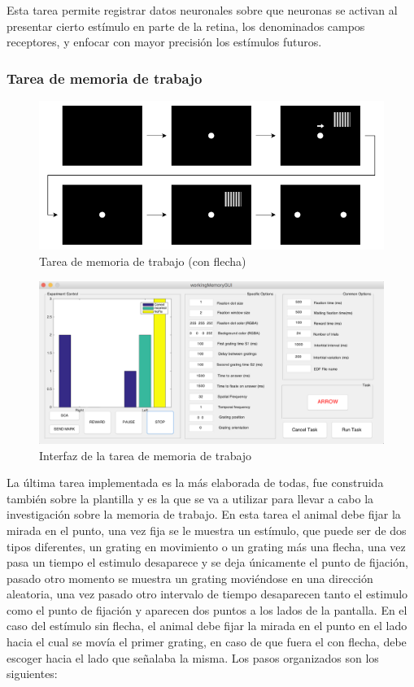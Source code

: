 \documentclass[conference]{IEEEtran}
\begin{document}
Esta tarea permite registrar datos neuronales sobre que neuronas se activan al presentar cierto estímulo en parte de la retina, los denominados campos receptores,  y enfocar con mayor precisión los estímulos futuros.


\subsubsection*{Tarea de memoria de trabajo}

\begin{figure}[htbp]
\centerline{\includegraphics[width=\linewidth]{figures/memory_task}}
\caption{Tarea de memoria de trabajo (con flecha)}
\label{figMemoryTask}
\end{figure}

\begin{figure}
  \includegraphics[width=\textwidth]{figures/memory_gui}
  \caption{Interfaz de la tarea de memoria de trabajo}
  \label{figMemoryGui}

\end{figure}

La última tarea implementada es la más elaborada de todas, fue construida también sobre la plantilla y es la que se va a utilizar para llevar a cabo la investigación sobre la memoria de trabajo. 
En esta tarea el animal debe fijar la mirada en el punto, una vez fija se le muestra un estímulo, que puede ser de dos tipos diferentes, un grating en movimiento o un grating más una flecha, una vez pasa un tiempo el estimulo desaparece y se deja únicamente el punto de fijación, pasado otro momento se muestra un grating moviéndose en una dirección aleatoria, una vez pasado otro intervalo de tiempo desaparecen tanto el estimulo como el punto de fijación y aparecen dos puntos a los lados de la pantalla. En el caso del estímulo sin flecha, el animal debe fijar la mirada en el punto en el lado hacia el cual se movía el primer grating, en caso de que fuera el con flecha, debe escoger  hacia el lado que señalaba la misma.
Los pasos organizados son los siguientes:
\end{document}
